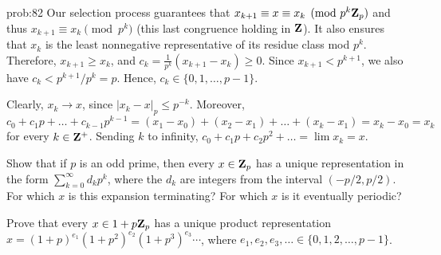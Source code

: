 \begin{sol}{prob:82} Our selection process guarantees that $x_{k+1}\equiv x \equiv x_k\pmod{p^k\mathbf{Z}_{p}}$ and thus $x_{k+1} \equiv x_k \pmod{p^k}$ (this last congruence holding in $\mathbf{Z}$). It also ensures that $x_k$ is the least nonnegative representative of its residue class mod $p^k$. Therefore, $x_{k+1} \ge x_k$, and $c_k = \frac{1}{p^k} (x_{k+1}-x_k) \ge 0$. Since $x_{k+1} < p^{k+1}$, we also have $c_k < p^{k+1}/p^k = p$. Hence, $c_k \in \{0,1,\dots,p-1\}$. 

Clearly, $x_k\to x$, since $|x_k - x|_p \le p^{-k}$. Moreover,
\[ c_0 + c_1 p + \dots + c_{k-1} p^{k-1} = (x_1-x_0) +(x_2-x_1) + \dots + (x_k-x_1) = x_k-x_0 = x_k \]
for every $k\in \mathbf{Z}^{+}$. Sending $k$ to infinity, $c_0 + c_1 p + c_2 p^2 + \dots = \lim x_k = x$.
\end{sol}



\begin{challenge} Show that if $p$ is an odd prime, then every $x \in \mathbf{Z}_p$ has a unique representation in the form $\sum_{k=0}^{\infty} d_k p^k$, where the $d_k$ are integers from the interval $(-p/2,p/2)$. For which $x$ is this expansion terminating? For which $x$ is it eventually periodic?
\end{challenge}


\begin{challenge} Prove that every $x \in 1 + p\mathbf{Z}_p$ has a unique product representation $x = (1+p)^{e_1}(1+p^2)^{e_2}(1+ p^3)^{e_3}\cdots$, where $e_1, e_2, e_3,\ldots \in \{0,1,2,\dots,p-1\}$.%
\end{challenge}


